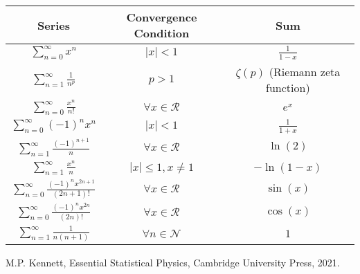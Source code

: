 \documentclass{article}
\begin{document}
\renewcommand{\arraystretch}{1.5}
\begin{center}
    \begin{tabular}{|c|c|c|}
        \hline
        \textbf{Series}                                       & \textbf{Convergence Condition} & \textbf{Sum}                       \\
        \hline
        $\sum_{n=0}^{\infty} x^n$                             & $|x| < 1$                      & $\frac{1}{1-x}$                    \\
        \hline
        $\sum_{n=1}^{\infty} \frac{1}{n^p}$                   & $p > 1$                        & $\zeta(p)$ (Riemann zeta function) \\
        \hline
        $\sum_{n=0}^{\infty} \frac{x^n}{n!}$                  & $\forall x \in \mathcal{R}$    & $e^x$                              \\
        \hline
        $\sum_{n=0}^{\infty} (-1)^n x^n$                      & $|x| < 1$                      & $\frac{1}{1+x}$                    \\
        \hline
        $\sum_{n=1}^{\infty} \frac{(-1)^{n+1}}{n}$            & $\forall x \in \mathcal{R}$    & $\ln(2)$                           \\
        \hline
        $\sum_{n=1}^{\infty} \frac{x^n}{n}$                   & $|x| \leq 1, x \neq 1$         & $-\ln(1-x)$                        \\
        \hline
        $\sum_{n=0}^{\infty} \frac{(-1)^n x^{2n+1}}{(2n+1)!}$ & $\forall x \in \mathcal{R}$    & $\sin(x)$                          \\
        \hline
        $\sum_{n=0}^{\infty} \frac{(-1)^n x^{2n}}{(2n)!}$     & $\forall x \in \mathcal{R}$    & $\cos(x)$                          \\
        \hline
        $\sum_{n=1}^{\infty} \frac{1}{n(n+1)}$                & $\forall n \in \mathcal{N}$    & $1$                                \\
        \hline
    \end{tabular}
\end{center}


\newpage

\begin{thebibliography}{9}

    M.P. Kennett,
    Essential Statistical Physics,
    Cambridge University Press,
    2021.



\end{thebibliography}
\end{document}
